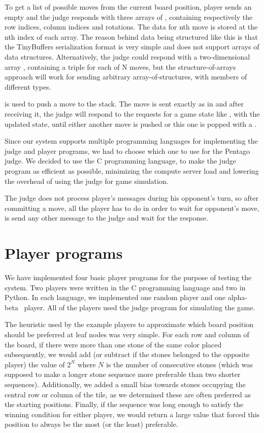 To get a list of possible moves from the current board position, player sends
an empty  and the judge responds with three arrays of
, containing respectively the row indices, column indices and rotations.
The data for nth move is stored at the nth index of each array. The reason
behind data being structured like this is that the TinyBuffers serialization
format is very simple and does not support arrays of data structures.
Alternatively, the judge could respond with a two-dimensional array
, containing a  triple for each of N moves, but the
structure-of-arrays approach will work for sending arbitrary
array-of-structures, with members of different types.

 is used to push a move to the stack. The move is sent
exactly as in  and after receiving it, the judge will
respond to the requests for a game state like , with the
updated state, until either another move is pushed or this one is popped with a
.

Since our system supports multiple programming languages for implementing the
judge and player programs, we had to choose which one to use for the Pentago
judge. We decided to use the C programming language, to make the judge program
as efficient as possible, minimizing the compute server load and lowering the
overhead of using the judge for game simulation.

The judge does not process player's messages during his opponent's turn, so
after committing a move, all the player has to do in order to wait for
opponent's move, is send any other message to the judge and wait for the
response.

\section{Player programs}

We have implemented four basic player programs for the purpose of testing the
system. Two players were written in the C programming language and two in
Python. In each language, we implemented one random player and one
alpha-beta~\cite{Campbell1983} player. All of the players used the judge
program for simulating the game.

The heuristic used by the example players to approximate which board position
should be preferred at leaf nodes was very simple. For each row and column of
the board, if there were more than one stone of the same color placed
subsequently, we would add (or subtract if the stones belonged to the opposite
player) the value of $2^N$ where $N$ is the number of consecutive stones (which
was supposed to make a longer stone sequence more preferable than two shorter
sequences). Additionally, we added a small bias towards stones occupying the
central row or column of the tile, as we determined these are often preferred
as the starting positions. Finally, if the sequence was long enough to satisfy
the winning condition for either player, we would return a large value that
forced this position to always be the most (or the least) preferable.

